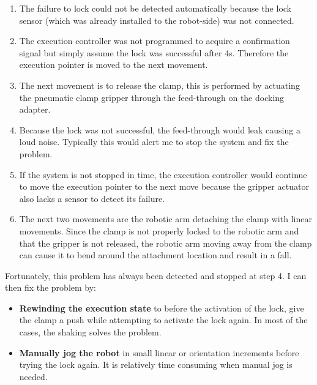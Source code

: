 \begin{enumerate}
	\item The failure to lock could not be detected automatically because the lock sensor (which was already installed to the robot-side) was not connected.

	\item The execution controller was not programmed to acquire a confirmation signal but simply assume the lock was successful after 4s. Therefore the execution pointer is moved to the next movement.

	\item The next movement is to release the clamp, this is performed by actuating the pneumatic clamp gripper through the feed-through on the docking adapter.

	\item Because the lock was not successful, the feed-through would leak causing a loud noise. Typically this would alert me to stop the system and fix the problem.

	\item If the system is not stopped in time, the execution controller would continue to move the execution pointer to the next move because the gripper actuator also lacks a sensor to detect its failure.

	\item The next two movements are the robotic arm detaching the clamp with linear movements. Since the clamp is not properly locked to the robotic arm and that the gripper is not released, the robotic arm moving away from the clamp can cause it to bend around the attachment location and result in a fall. 

\end{enumerate}

Fortunately, this problem has always been detected and stopped at step 4. I can then fix the problem by:

\begin{itemize}
	\item \textbf{Rewinding the execution state }to before the activation of the lock, give the clamp a push while attempting to activate the lock again. In most of the cases, the shaking solves the problem.

	\item \textbf{Manually jog the robot} in small linear or orientation increments before trying the lock again. It is relatively time consuming when manual jog is needed.

\end{itemize}
